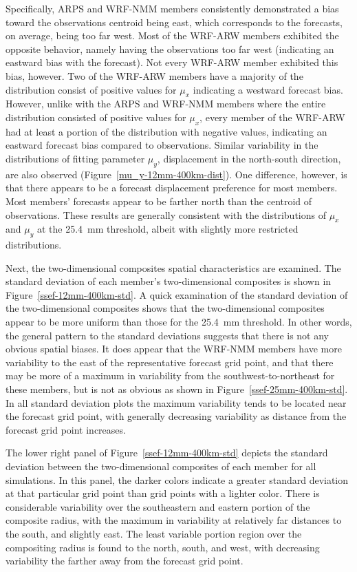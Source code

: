 Specifically, ARPS and WRF-NMM members consistently demonstrated a bias toward the observations centroid being east, which corresponds to the forecasts, on average, being too far west.
Most of the WRF-ARW members exhibited the opposite behavior, namely having the observations too far west (indicating an eastward bias with the forecast).
Not every WRF-ARW member exhibited this bias, however.
Two of the WRF-ARW members have a majority of the distribution consist of positive values for $\mu_x$ indicating a westward forecast bias.
However, unlike with the ARPS and WRF-NMM members where the entire distribution consisted of positive values for $\mu_x$, every member of the WRF-ARW had at least a portion of the distribution with negative values, indicating an eastward forecast bias compared to observations.
Similar variability in the distributions of fitting parameter $\mu_y$, displacement in the north-south direction, are also observed (\mbox{Figure \ref{mu_y-12mm-400km-dist}}).
One difference, however, is that there appears to be a forecast displacement preference for most members.
Most members' forecasts appear to be farther north than the centroid of observations.
These results are generally consistent with the distributions of $\mu_x$ and $\mu_y$ at the \mbox{25.4 mm} threshold, albeit with slightly more restricted distributions.


Next, the two-dimensional composites spatial characteristics are examined.
The standard deviation of each member's two-dimensional composites is shown in \mbox{Figure \ref{ssef-12mm-400km-std}}.
A quick examination of the standard deviation of the two-dimensional composites shows that the two-dimensional composites appear to be more uniform than those for the \mbox{25.4 mm} threshold.
In other words, the general pattern to the standard deviations suggests that there is not any obvious spatial biases.
It does appear that the WRF-NMM members have more variability to the east of the representative forecast grid point, and that there may be more of a maximum in variability from the southwest-to-northeast for these members, but is not as obvious as shown in \mbox{Figure \ref{ssef-25mm-400km-std}}.
In all standard deviation plots the maximum variability tends to be located near the forecast grid point, with generally decreasing variability as distance from the forecast grid point increases.


The lower right panel of \mbox{Figure \ref{ssef-12mm-400km-std}} depicts the standard deviation between the two-dimensional composites of each member for all simulations.
In this panel, the darker colors indicate a greater standard deviation at that particular grid point than grid points with a lighter color.
There is considerable variability over the southeastern and eastern portion of the composite radius, with the maximum in variability at relatively far distances to the south, and slightly east.
The least variable portion region over the compositing radius is found to the north, south, and west, with decreasing variability the farther away from the forecast grid point.


